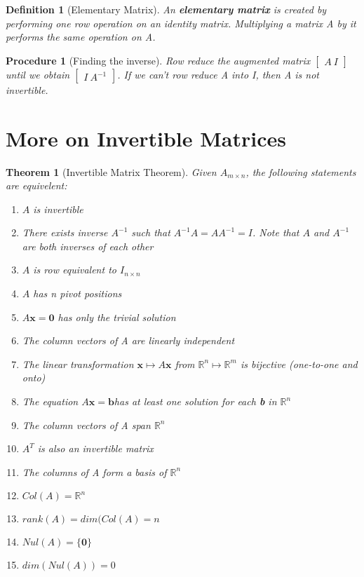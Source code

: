 \documentclass[12pt]{report}
\newtheorem{thm}{Theorem}
\newtheorem{dfn}{Definition}
\newtheorem{proc}{Procedure}
\newcommand{\mtx}[3]{$#1_{#2\times #3}$}
\newcommand{\mateq}{$A\bm{x}=\bm{b}$}
\begin{document}
\begin{dfn}[Elementary Matrix]
An \textbf{elementary matrix} is created by performing one row operation on an identity matrix. Multiplying a matrix A by it performs the same operation on A.
\end{dfn}

\begin{proc}[Finding the inverse]
Row reduce the augmented matrix $\begin{bmatrix}A \: I \end{bmatrix}$ until we obtain $\begin{bmatrix}I \: A^{-1} \end{bmatrix}$. If we can't row reduce A into I, then A is not invertible.
\end{proc}

\section{More on Invertible Matrices}

\begin{thm}[Invertible Matrix Theorem]
Given \mtx{A}{m}{n}, the following statements are equivelent:

\begin{enumerate}
\item $A$ is invertible
\item There exists inverse $A^{-1}$ such that $A^{-1}A=AA^{-1}=I$. Note that $A$ and $A^{-1}$ are both inverses of each other
\item $A$ is row equivalent to \mtx{I}{n}{n}
\item $A$ has n pivot positions
\item $A\bm{x}=\bm{0}$ has only the trivial solution
\item The column vectors of A are linearly independent
\item The linear transformation $\bm{x} \mapsto A\bm{x}$ from $\mathbb{R}^n \mapsto \mathbb{R}^m$ is bijective (one-to-one and onto)
\item The equation \mateq has at least one solution for each \textbf{b} in $\mathbb{R}^n$
\item The column vectors of A span $\mathbb{R}^n$
\item $A^T$ is also an invertible matrix
\item The columns of A form a basis of $\mathbb{R}^n$
\item $Col(A)=\mathbb{R}^n$
\item $rank(A)=dim(Col(A)=n$
\item $Nul(A)=\{\bm{0}\}$
\item $dim(Nul(A))=0$

\end{enumerate}
\end{thm}
\end{document}
